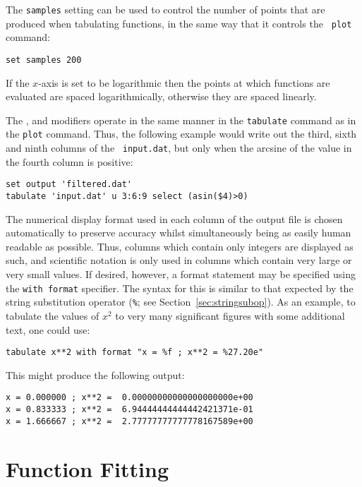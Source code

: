 The {\tt samples} setting can be used to control the number of points that are
produced when tabulating functions, in the same way that it controls the {\tt
plot} command:

\begin{verbatim}
set samples 200
\end{verbatim}

\noindent If the $x$-axis is set to be logarithmic then the points at which
functions are evaluated are spaced logarithmically, otherwise they are spaced
linearly.

The ,  and  modifiers operate in
the same manner in the {\tt tabulate} command as in the {\tt plot} command.
Thus, the following example would write out the third, sixth and ninth columns
of the \datafile\ {\tt input.dat}, but only when the arcsine of the value in the
fourth column is positive:

\begin{verbatim}
set output 'filtered.dat'
tabulate 'input.dat' u 3:6:9 select (asin($4)>0)
\end{verbatim}

The numerical display format used in each column of the output file is chosen
automatically to preserve accuracy whilst simultaneously being as easily human
readable as possible.  Thus, columns which contain only integers are displayed
as such, and scientific notation is only used in columns which contain very
large or very small values.  If desired, however, a format statement may be
specified using the {\tt with format} specifier. The syntax for this is similar
to that expected by the string substitution operator ({\tt \%}; see
Section~\ref{sec:stringsubop}). As an example, to tabulate the values of $x^2$
to very many significant figures with some additional text, one could use:

\begin{verbatim}
tabulate x**2 with format "x = %f ; x**2 = %27.20e"
\end{verbatim}

This might produce the following output:

\begin{verbatim}
x = 0.000000 ; x**2 =  0.00000000000000000000e+00
x = 0.833333 ; x**2 =  6.94444444444442421371e-01
x = 1.666667 ; x**2 =  2.77777777777778167589e+00
\end{verbatim}

\section{Function Fitting}
\label{sec:fit_command}

